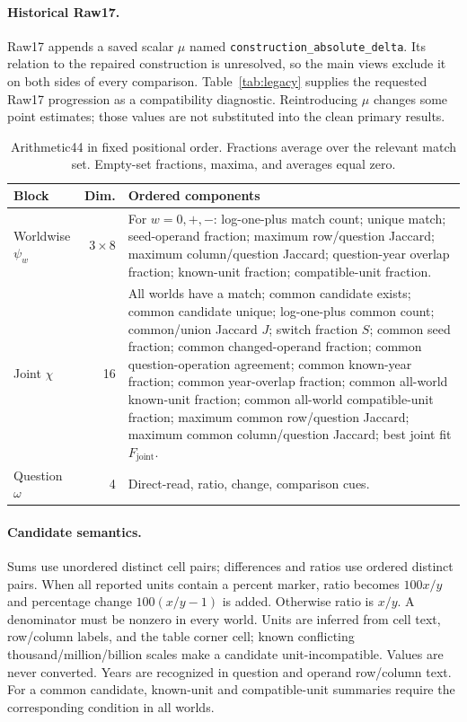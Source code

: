 \paragraph{Historical Raw17.}
Raw17 appends a saved scalar $\mu$ named \texttt{construction\_absolute\_delta}. Its relation to the repaired construction is unresolved, so the main views exclude it on both sides of every comparison. Table~\ref{tab:legacy} supplies the requested Raw17 progression as a compatibility diagnostic. Reintroducing $\mu$ changes some point estimates; those values are not substituted into the clean primary results.


\begin{table}[t]
\centering\small
\caption{Arithmetic44 in fixed positional order. Fractions average over the relevant match set. Empty-set fractions, maxima, and averages equal zero.}
\label{tab:feature-schema}
\begin{tabularx}{\textwidth}{@{}lrX@{}}
\toprule
Block & Dim. & Ordered components\\\midrule
Worldwise $\psi_w$ & $3\times8$ & For $w=0,+,-$: log-one-plus match count; unique match; seed-operand fraction; maximum row/question Jaccard; maximum column/question Jaccard; question-year overlap fraction; known-unit fraction; compatible-unit fraction.\\\addlinespace
Joint $\chi$ & 16 & All worlds have a match; common candidate exists; common candidate unique; log-one-plus common count; common/union Jaccard $J$; switch fraction $S$; common seed fraction; common changed-operand fraction; common question-operation agreement; common known-year fraction; common year-overlap fraction; common all-world known-unit fraction; common all-world compatible-unit fraction; maximum common row/question Jaccard; maximum common column/question Jaccard; best joint fit $F_{\mathrm{joint}}$.\\\addlinespace
Question $\omega$ & 4 & Direct-read, ratio, change, comparison cues.\\\bottomrule
\end{tabularx}
\end{table}

\paragraph{Candidate semantics.}
Sums use unordered distinct cell pairs; differences and ratios use ordered distinct pairs. When all reported units contain a percent marker, ratio becomes $100x/y$ and percentage change $100(x/y-1)$ is added. Otherwise ratio is $x/y$. A denominator must be nonzero in every world. Units are inferred from cell text, row/column labels, and the table corner cell; known conflicting thousand/million/billion scales make a candidate unit-incompatible. Values are never converted. Years are recognized in question and operand row/column text. For a common candidate, known-unit and compatible-unit summaries require the corresponding condition in all worlds.


